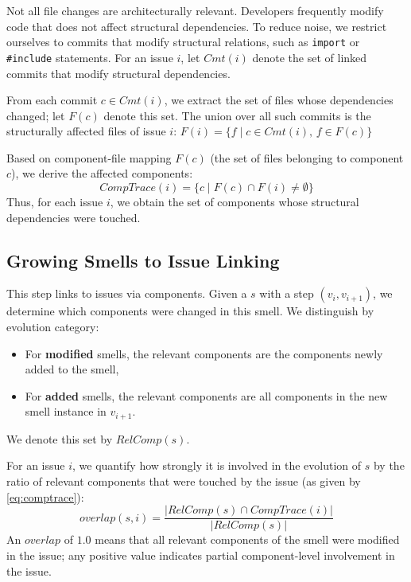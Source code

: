 Not all file changes are architecturally relevant.
Developers frequently modify code that does not affect structural dependencies.
To reduce noise, we restrict ourselves to commits that modify structural relations, such as \texttt{import} or \texttt{\#include} statements.
For an issue $i$, let $\mathit{Cmt}(i)$ denote the set of linked commits that modify structural dependencies.

From each commit $c \in \mathit{Cmt}(i)$, we extract the set of files whose dependencies changed; let $\mathit{F}(c)$ denote this set.
The union over all such commits is the structurally affected files of issue $i$:
$\mathit{F}(i) = \{ f \mid c \in \mathit{Cmt}(i),\, f \in \mathit{F}(c) \}$

Based on component-file mapping $\mathit{F}(c)$ (the set of files belonging to component $c$), we derive the affected components:
\begin{equation}
    \label{eq:comptrace}
    \mathit{CompTrace}(i) = \{ c \mid \mathit{F}(c) \cap \mathit{F}(i) \neq \emptyset \}
\end{equation}
Thus, for each issue $i$, we obtain the set of components whose structural dependencies were touched.



\subsection{Growing Smells to Issue Linking}
This step links \gs to issues via components.
Given a \gs $s$ with a step $(v_i, v_{i+1})$, we determine which components were changed in this smell.
We distinguish by evolution category:

\begin{itemize}[leftmargin=*]
    \item For \textbf{modified} smells, the relevant components are the components newly added to the smell, 
    \item For \textbf{added} smells, the relevant components are all components in the new smell instance in $v_{i+1}$.
\end{itemize}
We denote this set by $\mathit{RelComp}(s)$.

For an issue $i$, we quantify how strongly it is involved in the evolution of $s$ by the ratio of relevant components that were touched by the issue (as given by \autoref{eq:comptrace}):
\begin{equation}
    \mathit{overlap}(s, i) =
    \frac{ \left| \mathit{RelComp}(s) \cap \mathit{CompTrace}(i) \right| }
    { \left| \mathit{RelComp}(s) \right| }
    \label{eq-overlap-si}
\end{equation}
An $\mathit{overlap}$ of $1.0$ means that all relevant components of the smell were modified in the issue; any positive value indicates partial component-level involvement in the issue.

